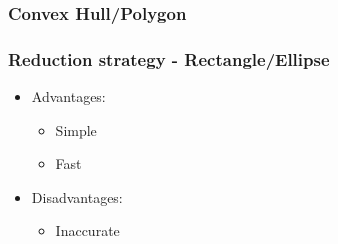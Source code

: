 \subsubsection{Convex Hull/Polygon}
\begin{frame}
\frametitle{Reduction strategy - Rectangle/Ellipse}
\begin{multicols}{2}
	\begin{itemize}
		\item Advantages:
		\begin{itemize}
			\item Simple
			\item Fast
		\end{itemize}
	\end{itemize}
\columnbreak
	\begin{itemize}
		\item Disadvantages:
		\begin{itemize}
			\item Inaccurate
			\linebreak
		\end{itemize}
	\end{itemize}
\end{multicols}

\end{frame}
%
